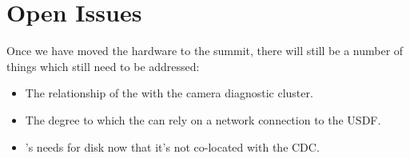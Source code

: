 \section{Open Issues}

Once we have moved the hardware to the summit, there will still be a number of things which still need
to be addressed:

\begin{itemize}
\item
  The relationship of the \CC with the camera diagnostic cluster.
\item
  The degree to which the \CC can rely on a network connection to the USDF.
\item
  \CC's needs for disk now that it's not co-located with the CDC.
\end{itemize}
